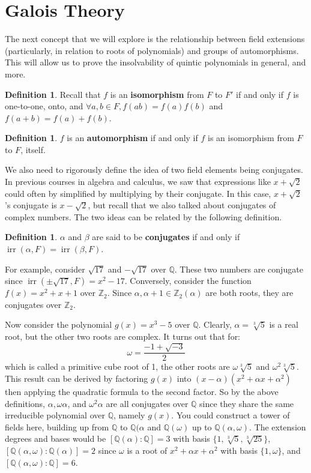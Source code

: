 \documentclass[11pt]{amsart}
\theoremstyle{definition}
\newtheorem{definition}[theorem]{Definition}
\newcommand{\rationals}{\mathbb{Q}}
\newcommand{\integers}{\mathbb{Z}}
\DeclareMathOperator{\irr}{irr}
\begin{document}
\section{Galois Theory}
The next concept that we will explore is the relationship between field extensions (particularly, in relation to roots of polynomials) and groups
of automorphisms. This will allow us to prove the insolvability of quintic polynomials in general, and more.
\begin{definition}
	Recall that $f$ is an \textbf{isomorphism} from $F$ to $F'$ if and only if $f$ is one-to-one, onto, and $\forall a, b \in F, f(ab) = f(a)f(b)$ and
	$f(a + b) = f(a) + f(b)$.
\end{definition}
\begin{definition}
	$f$ is an \textbf{automorphism} if and only if $f$ is an isomorphism from $F$ to $F$, itself.
\end{definition}
We also need to rigorously define the idea of two field elements being conjugates. In previous courses in algebra and calculus, we saw that
expressions like $x + \sqrt{2}$ could often by simplified by multiplying by their conjugate. In this case, $x + \sqrt{2}$'s conjugate is $x - \sqrt{2}$, 
but recall that we also talked about conjugates of complex numbers. The two ideas can be related by the following definition.
\begin{definition}
	$\alpha$ and $\beta$ are said to be \textbf{conjugates} if and only if $\irr(\alpha, F) = \irr(\beta, F)$.
\end{definition}
For example, consider $\sqrt{17}$ and $-\sqrt{17}$ over $\rationals$. These two numbers are conjugate since $\irr(\pm\sqrt{17}, F) = x^2 - 17$.
Conversely, consider the function $f(x) = x^2 + x + 1$ over $\integers_2$. Since $\alpha, \alpha + 1 \in \integers_2(\alpha)$ are both roots, they
are conjugates over $\integers_2$.

Now consider the polynomial $g(x) = x^3 - 5$ over $\rationals$. Clearly, $\alpha = \sqrt[3]{5}$ is a real root, but the other two roots are complex.
It turns out that for:
\[
	\omega = \frac{-1 + \sqrt{-3}}{2}
\]
which is called a primitive cube root of 1, the other roots are $\omega \sqrt[3]{5}$ and $\omega^2 \sqrt[3]{5}$. This result can be derived by
factoring $g(x)$ into $(x - \alpha)(x^2 + \alpha x + \alpha^2)$ then applying the quadratic formula to the second factor. So by the above
definitions, $\alpha, \omega \alpha$, and $\omega^2 \alpha$ are all conjugates over $\rationals$ since they share the same irreducible
polynomial over $\rationals$, namely $g(x)$. You could construct a tower of fields here, building up from $\rationals$ to $\rationals(\alpha$ and 
$\rationals(\omega)$ up to $\rationals(\alpha, \omega)$. The extension degrees and bases would be $[ \rationals(\alpha) : \rationals ] = 3$ with
basis $\{ 1, \sqrt[3]{5}, \sqrt[3]{25} \}$, $[ \rationals(\alpha, \omega) : \rationals(\alpha) ] = 2$ since $\omega$ is a root of 
$x^2 + \alpha x + \alpha^2$ with basis $\{ 1, \omega \}$, and $[ \rationals(\alpha, \omega) : \rationals ] = 6$.
\end{document}
